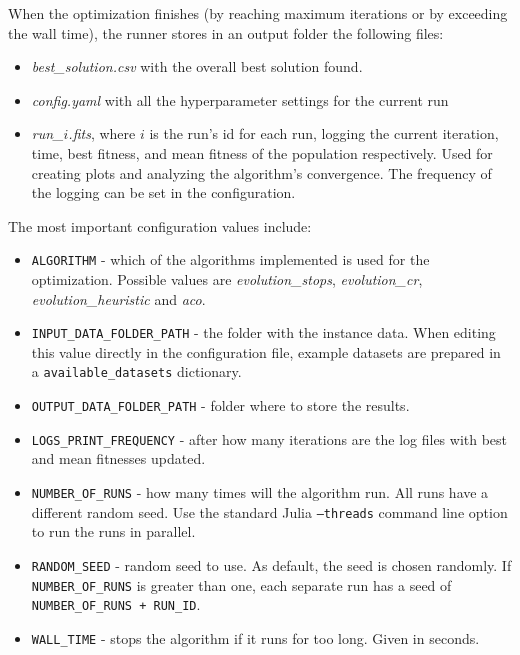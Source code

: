 When the optimization finishes (by reaching maximum iterations or by exceeding the wall time), the runner stores in an output folder the following files:

\begin{itemize}
    \setlength\itemsep{0pt}
    \item \textit{best\_solution.csv} with the overall best solution found.
    \item \textit{config.yaml} with all the hyperparameter settings for the current run
    \item \textit{run\_$i$.fits}, where $i$ is the run's id for each run, logging the current iteration, time, best fitness, and mean fitness of the population respectively. Used for creating plots and analyzing the algorithm's convergence. The frequency of the logging can be set in the configuration.
\end{itemize}

The most important configuration values include:

\begin{itemize}
    \setlength\itemsep{0pt}
    \item \texttt{ALGORITHM} - which of the algorithms implemented is used for the optimization. Possible values are \textit{evolution\_stops}, \textit{evolution\_cr}, \textit{evolution\_heuristic} and \textit{aco}.
    \item \texttt{INPUT\_DATA\_FOLDER\_PATH} - the folder with the instance data. When editing this value directly in the configuration file, example datasets are prepared in a \texttt{available\_datasets} dictionary.
    \item \texttt{OUTPUT\_DATA\_FOLDER\_PATH} - folder where to store the results.
    \item \texttt{LOGS\_PRINT\_FREQUENCY} - after how many iterations are the log files with best and mean fitnesses updated.
    \item \texttt{NUMBER\_OF\_RUNS} - how many times will the algorithm run. All runs have a different random seed. Use the standard Julia \texttt{--threads} command line option to run the runs in parallel.
    \item \texttt{RANDOM\_SEED} - random seed to use. As default, the seed is chosen randomly. If \texttt{NUMBER\_OF\_RUNS} is greater than one, each separate run has a seed of \texttt{NUMBER\_OF\_RUNS + RUN\_ID}. 
    \item \texttt{WALL\_TIME} - stops the algorithm if it runs for too long. Given in seconds. 
\end{itemize}

